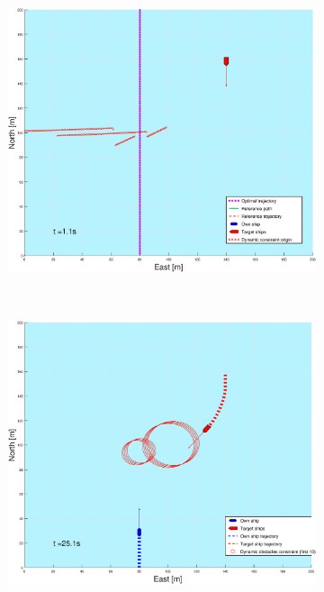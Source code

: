 \begin{figure}[!b]
\begin{subfigure}[b]{0.499\textwidth}
        \includegraphics[width=\textwidth]{Images/Figures/sving_GW/_Simple_0fig999_time=1}
    \end{subfigure}
    \hfill
    \\
    \begin{subfigure}[b]{0.49\textwidth}
        \centering
        \includegraphics[width=\textwidth]{Images/Figures/sving_GW/_Simple_0fig1_time=25}
    \end{subfigure}

\end{figure}
